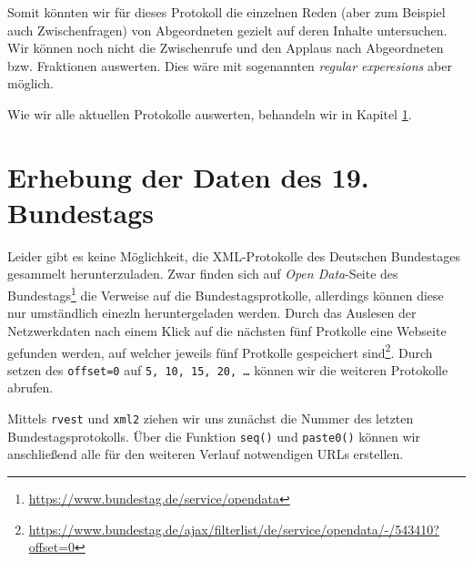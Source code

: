 \documentclass[oneside, 12pt, numbers=endperiod]{scrbook}
\newenvironment{Shaded}{\begin{snugshade}}{\end{snugshade}}
\newcommand{\CharTok}[1]{\textcolor[rgb]{0.31,0.60,0.02}{#1}}
\newcommand{\DataTypeTok}[1]{\textcolor[rgb]{0.13,0.29,0.53}{#1}}
\newcommand{\DecValTok}[1]{\textcolor[rgb]{0.00,0.00,0.81}{#1}}
\newcommand{\KeywordTok}[1]{\textcolor[rgb]{0.13,0.29,0.53}{\textbf{#1}}}
\newcommand{\NormalTok}[1]{#1}
\newcommand{\OperatorTok}[1]{\textcolor[rgb]{0.81,0.36,0.00}{\textbf{#1}}}
\newcommand{\OtherTok}[1]{\textcolor[rgb]{0.56,0.35,0.01}{#1}}
\newcommand{\StringTok}[1]{\textcolor[rgb]{0.31,0.60,0.02}{#1}}
\theoremstyle{definition}
\theoremstyle{definition}
\theoremstyle{definition}
\theoremstyle{remark}
\begin{document}
Somit könnten wir für dieses Protokoll die einzelnen Reden (aber zum
Beispiel auch Zwischenfragen) von Abgeordneten gezielt auf deren Inhalte
untersuchen. Wir können noch nicht die Zwischenrufe und den Applaus nach
Abgeordneten bzw. Fraktionen auswerten. Dies wäre mit sogenannten
\emph{regular experesions} aber möglich.

Wie wir alle aktuellen Protokolle auswerten, behandeln wir in Kapitel
\ref{data-02}.

\hypertarget{data-02}{%
\chapter{Erhebung der Daten des 19. Bundestags}\label{data-02}}

Leider gibt es keine Möglichkeit, die XML-Protokolle des Deutschen
Bundestages gesammelt herunterzuladen. Zwar finden sich auf \emph{Open
Data}-Seite des Bundestags\footnote{\url{https://www.bundestag.de/service/opendata}}
die Verweise auf die Bundestagsprotkolle, allerdings können diese nur
umständlich einezln heruntergeladen werden. Durch das Auslesen der
Netzwerkdaten nach einem Klick auf die nächsten fünf Protkolle eine
Webseite gefunden werden, auf welcher jeweils fünf Protkolle gespeichert
sind\footnote{\url{https://www.bundestag.de/ajax/filterlist/de/service/opendata/-/543410?offset=0}}.
Durch setzen des \texttt{offset=0} auf
\texttt{5,\ 10,\ 15,\ 20,\ \ldots{}} können wir die weiteren Protokolle
abrufen.

Mittels \texttt{rvest} und \texttt{xml2} ziehen wir uns zunächst die
Nummer des letzten Bundestagsprotokolls. Über die Funktion
\texttt{seq()} und \texttt{paste0()} können wir anschließend alle für
den weiteren Verlauf notwendigen URLs erstellen.

\begin{Shaded}
\end{Shaded}
\end{document}
